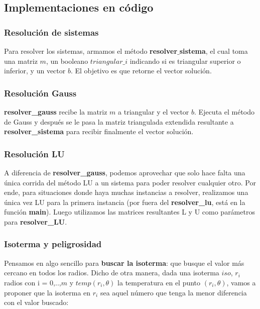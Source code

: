 \subsection{Implementaciones en código}

\subsubsection{Resolución de sistemas}

Para resolver los sistemas, armamos el método \textbf{resolver$\_$sistema}, el cual toma una matriz $m$, un booleano \newline
$triangular\_i$ indicando si es triangular superior o inferior, y un vector $b$. El objetivo es que retorne el vector solución.

\subsubsection{Resolución Gauss}
\textbf{resolver\_gauss} recibe la matriz $m$ a triangular y el vector $b$. Ejecuta el método de Gauss y después se le pasa la matriz triangulada extendida resultante a \textbf{resolver\_sistema} para recibir finalmente el vector solución. 

\subsubsection{Resolución LU}
A diferencia de \textbf{resolver\_gauss}, podemos aprovechar que solo hace falta una única corrida del método LU a un sistema para poder resolver cualquier otro. Por ende, para situaciones donde haya muchas instancias a resolver, realizamos una única vez LU para la primera instancia (por fuera del \textbf{resolver\_lu}, está en la función \textbf{main}). Luego utilizamos las matrices resultantes L y U como parámetros para \textbf{resolver\_LU}. 

\subsubsection{Isoterma y peligrosidad}

Pensamos en algo sencillo para \textbf{buscar la isoterma}: que busque el valor más cercano en todos los radios. Dicho de otra manera, dada una isoterma $iso$, $r_i$ radios con i = 0,..,$m$ y $temp(r_{i}, \theta)$ la temperatura en el punto $(r_i, \theta)$, vamos a proponer que la isoterma en $r_i$ sea aquel número que tenga la menor diferencia con el valor buscado:

